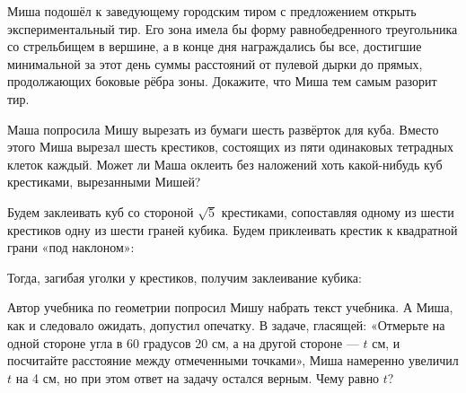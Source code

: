 % 

\begin{itemize}
\itA Миша подошёл к заведующему городским тиром с предложением открыть экспериментальный тир. Его зона имела бы форму равнобедренного треугольника со стрельбищем в вершине, а в конце дня награждались бы все, достигшие минимальной за этот день суммы расстояний от пулевой дырки до прямых, продолжающих боковые рёбра зоны. Докажите, что Миша тем самым разорит тир.

\itB Маша попросила Мишу вырезать из бумаги шесть развёрток для куба. Вместо этого Миша вырезал шесть крестиков, состоящих из пяти одинаковых тетрадных клеток каждый. Может ли Маша оклеить без наложений хоть какой-нибудь куб крестиками, вырезанными Мишей?

Будем заклеивать куб со стороной $\sqrt 5$ крестиками, сопоставляя одному из шести крестиков одну из шести граней кубика. Будем приклеивать крестик к квадратной грани «под наклоном»:

\begin{center}
\end{center}

Тогда, загибая уголки у крестиков, получим заклеивание кубика:

\begin{center}
\end{center}

\itC Автор учебника по геометрии попросил Мишу набрать текст учебника. А Миша, как и следовало ожидать, допустил опечатку. В задаче, гласящей: «Отмерьте на одной стороне угла в 60 градусов 20 см, а на другой стороне — $t$ см, и посчитайте расстояние между отмеченными точками», Миша намеренно увеличил $t$ на 4 см, но при этом ответ на задачу остался верным. Чему равно $t$?
\end{itemize}


% 